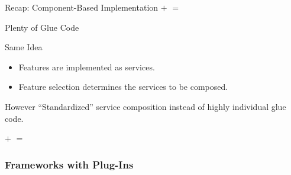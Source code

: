 \begin{frame}{\myframetitle}
	\begin{mycolumns}[widths={40,60},animation=none]
		\begin{example}{Recap: Component-Based Implementation}
				\vspace*{\fill}
					$+$ 
				\vspace*{\fill}	
				\vspace*{\fill}
					$=$ 
				\vspace*{\fill}	
		\end{example}
		\begin{example}{Plenty of Glue Code}
			\centering
		\end{example}
	\mynextcolumn
		\pause
		\begin{definition}{Same Idea}
			\begin{itemize}
				\item Features are implemented as services.
				\item Feature selection determines the services to be composed.
			\end{itemize}
		\end{definition}
		\pause
		\begin{note}{However}
			``Standardized'' service composition instead of highly individual glue code.
		\end{note}
		\begin{example}{}
				\vspace*{\fill}
					$+$ 
				\vspace*{\fill}	
				\vspace*{\fill}
					$=$ 
				\vspace*{\fill}	
		\end{example}
	\end{mycolumns}	
\end{frame}

\subsubsection*{Frameworks with Plug-Ins}

